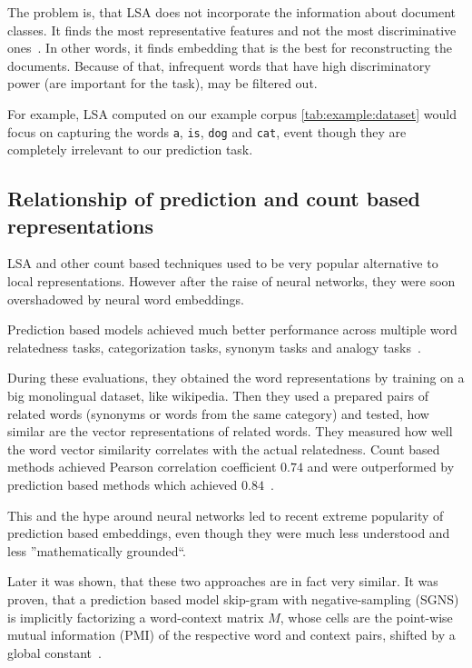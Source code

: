     The problem is, that LSA does not incorporate the information about document classes. 
    It finds the most representative features and not the most discriminative ones~\cite{berry1995using}.
    In other words, it finds embedding that is the best for reconstructing the documents.
    Because of that, infrequent words that have high discriminatory power (are important for the task), may be filtered out.
    
    For example, LSA computed on our example corpus \ref{tab:example:dataset} would focus on capturing the words \texttt{a}, \texttt{is}, \texttt{dog} and \texttt{cat},
    event though they are completely irrelevant to our prediction task.
    
    \subsection{Relationship of prediction and count based representations} \label{sec:count:vs:predict}
        
    LSA and other count based techniques used to be very popular alternative to local representations.
    However after the raise of neural networks, they were soon overshadowed by neural word embeddings.
    
    Prediction based models achieved much better performance across multiple word relatedness tasks, categorization tasks, synonym tasks and analogy tasks~\cite{baroni2014don}. %
    
    During these evaluations, they obtained the word representations by training on a big monolingual dataset, like wikipedia.
    Then they used a prepared pairs of related words (synonyms or words from the same category) and tested,
    how similar are the vector representations of related words. 
    They measured how well the word vector similarity correlates with the actual relatedness. 
    Count based methods achieved Pearson correlation coefficient $0.74$ and were outperformed by prediction based methods which achieved $0.84$~\cite{baroni2014don}.
    
    This and the hype around neural networks led to recent extreme popularity of prediction based embeddings,
    even though they were much less understood and less ''mathematically grounded``.
    
    Later it was shown, that these two approaches are in fact very similar.
    It was proven, that a prediction based model skip-gram with negative-sampling (SGNS) 
    is implicitly factorizing a word-context matrix $M$,
    whose cells are the point-wise mutual information (PMI) of the respective word and context pairs, 
    shifted by a global constant~\cite{levy2014neural}. %
    
